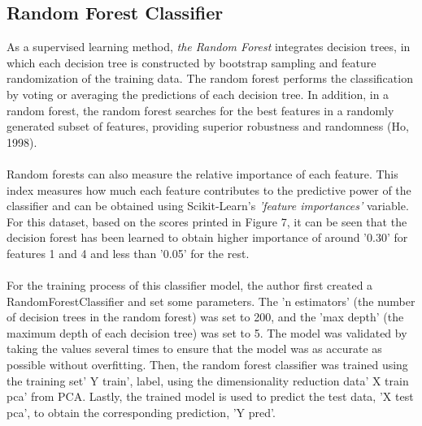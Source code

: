 \documentclass[10pt,twocolumn]{article}
\begin{document}
	\subsection{Random Forest Classifier}
	As a supervised learning method, \textit{the Random Forest} integrates decision trees, in which each decision tree is constructed by bootstrap sampling and feature randomization of the training data. The random forest performs the classification by voting or averaging the predictions of each decision tree. In addition, in a random forest, the random forest searches for the best features in a randomly generated subset of features, providing superior robustness and randomness (Ho, 1998).
	\\ \hspace*{\fill} \\
	Random forests can also measure the relative importance of each feature. This index measures how much each feature contributes to the predictive power of the classifier and can be obtained using Scikit-Learn's \textit{'feature importances'} variable. For this dataset, based on the scores printed in Figure 7, it can be seen that the decision forest has been learned to obtain higher importance of around '0.30' for features 1 and 4 and less than '0.05' for the rest.
	\\ \hspace*{\fill} \\
	For the training process of this classifier model, the author first created a RandomForestClassifier and set some parameters. The 'n estimators' (the number of decision trees in the random forest) was set to 200, and the 'max depth' (the maximum depth of each decision tree) was set to 5. The model was validated by taking the values several times to ensure that the model was as accurate as possible without overfitting. Then, the random forest classifier was trained using the training set' Y train', label, using the dimensionality reduction data' X train pca' from PCA. Lastly, the trained model is used to predict the test data, 'X test pca', to obtain the corresponding prediction, 'Y pred'.
	
\end{document}
